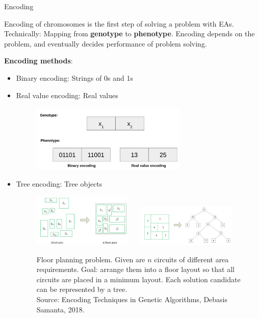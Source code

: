 \documentclass[11pt,compress,t,notes=noshow, xcolor=table]{beamer}
\begin{document}
\begin{vbframe}{Encoding}

Encoding of chromosomes is the first step of solving a problem with EAs.  Technically: Mapping from \textbf{genotype} to \textbf{phenotype}. Encoding depends on the problem, and eventually decides performance of problem solving. 

\lz 

\textbf{Encoding methods}: 
\begin{itemize}
  \item Binary encoding: Strings of 0s and 1s 
  \item Real value encoding: Real values 

  \begin{figure}
    \includegraphics[width=0.7\textwidth]{figure_man/encoding_binary_numeric.png}
  \end{figure}
  \item Tree encoding: Tree objects 
  \begin{figure}
    \includegraphics[width=0.45\textwidth]{figure_man/encoding_tree_1.png} ~~ \includegraphics[width=0.45\textwidth]{figure_man/encoding_tree_2.png} \\
    \begin{footnotesize}
      Floor planning problem. Given are $n$ circuits of different area requirements. Goal: arrange them into a floor layout so that all circuits are placed in a minimum layout. Each solution candidate can be represented by a tree. \\ 
      Source: Encoding Techniques in Genetic Algorithms, Debasis Samanta, 2018. \\
    \end{footnotesize}
  \end{figure}
\end{itemize}

\end{vbframe}
\end{document}
